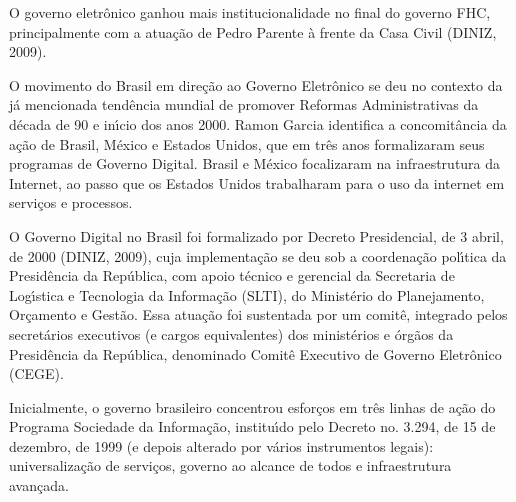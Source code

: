 \documentclass[
12pt,		%
openright,	%
twoside,  %
a4paper,			%
chapter=TITLE,		%
english,			%
french,				%
spanish,			%
brazil				%
]{USPSC-classe/USPSC}
\begin{document}
O governo eletr\^onico ganhou mais institucionalidade no final do governo FHC, principalmente com a atua\c{c}\~ao de Pedro Parente \`a frente da Casa Civil  (DINIZ, 2009).

















O movimento do Brasil em dire\c{c}\~ao ao Governo Eletr\^onico se deu no contexto da j\'a mencionada tend\^encia mundial de promover Reformas Administrativas da d\'ecada de 90 e in\'{\i}cio dos anos 2000. Ramon Garcia identifica a concomit\^ancia da a\c{c}\~ao de Brasil, M\'exico e Estados Unidos, que em tr\^es anos formalizaram seus programas de Governo Digital. Brasil e M\'exico focalizaram na infraestrutura da Internet, ao passo que os Estados Unidos trabalharam para o uso da internet em servi\c{c}os e processos.

















O Governo Digital no Brasil foi formalizado por Decreto Presidencial, de 3 abril, de 2000  (DINIZ, 2009), cuja implementa\c{c}\~ao se deu sob a coordena\c{c}\~ao pol\'{\i}tica da Presid\^encia da Rep\'ublica, com apoio t\'ecnico e gerencial da Secretaria de Log\'{\i}stica e Tecnologia da Informa\c{c}\~ao (SLTI), do Minist\'erio do Planejamento, Or\c{c}amento e Gest\~ao. Essa atua\c{c}\~ao foi sustentada por um comit\^e, integrado pelos secret\'arios executivos (e cargos equivalentes) dos minist\'erios e \'org\~aos da Presid\^encia da Rep\'ublica, denominado Comit\^e Executivo de Governo Eletr\^onico (CEGE).

















Inicialmente, o governo brasileiro concentrou esfor\c{c}os em tr\^es linhas de a\c{c}\~ao do Programa Sociedade da Informa\c{c}\~ao, institu\'{\i}do pelo Decreto no. 3.294, de 15 de dezembro, de 1999 (e depois alterado por v\'arios instrumentos legais): universaliza\c{c}\~ao de servi\c{c}os, governo ao alcance de todos e infraestrutura avan\c{c}ada.
\end{document}
